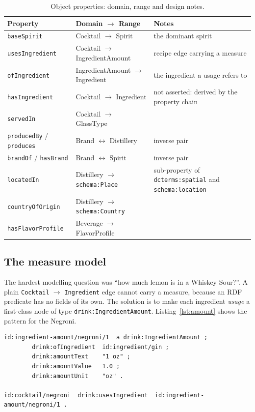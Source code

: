 \begin{table}[h]
  \centering
  \small
  \begin{tabular}{@{}llp{5.6cm}@{}}
    \toprule
    Property & Domain $\rightarrow$ Range & Notes \\
    \midrule
    \texttt{baseSpirit} & Cocktail $\rightarrow$ Spirit & the dominant spirit \\
    \texttt{usesIngredient} & Cocktail $\rightarrow$ IngredientAmount & recipe edge carrying a measure \\
    \texttt{ofIngredient} & IngredientAmount $\rightarrow$ Ingredient & the ingredient a usage refers to \\
    \texttt{hasIngredient} & Cocktail $\rightarrow$ Ingredient & not asserted: derived by the property chain \\
    \texttt{servedIn} & Cocktail $\rightarrow$ GlassType & \\
    \texttt{producedBy} / \texttt{produces} & Brand $\leftrightarrow$ Distillery & inverse pair \\
    \texttt{brandOf} / \texttt{hasBrand} & Brand $\leftrightarrow$ Spirit & inverse pair \\
    \texttt{locatedIn} & Distillery $\rightarrow$ \texttt{schema:Place} & sub-property of \texttt{dcterms:spatial} and \texttt{schema:location} \\
    \texttt{countryOfOrigin} & Distillery $\rightarrow$ \texttt{schema:Country} & \\
    \texttt{hasFlavorProfile} & Beverage $\rightarrow$ FlavorProfile & \\
    \bottomrule
  \end{tabular}
  \caption{Object properties: domain, range and design notes.}
  \label{tab:objectprops}
\end{table}

\subsection{The measure model}

The hardest modelling question was ``how much lemon is in a Whiskey Sour?''. A
plain \texttt{Cocktail} $\rightarrow$ \texttt{Ingredient} edge cannot carry a
measure, because an RDF predicate has no fields of its own. The solution is to
make each ingredient \emph{usage} a first-class node of type
\texttt{drink:IngredientAmount}. Listing~\ref{lst:amount} shows the pattern for
the Negroni.

\begin{lstlisting}[frame=single, basicstyle=\ttfamily\small,
    caption={Ingredient-amount pattern for the Negroni.},
    label={lst:amount}]
id:ingredient-amount/negroni/1  a drink:IngredientAmount ;
        drink:ofIngredient  id:ingredient/gin ;
        drink:amountText    "1 oz" ;
        drink:amountValue   1.0 ;
        drink:amountUnit    "oz" .

id:cocktail/negroni  drink:usesIngredient  id:ingredient-amount/negroni/1 .
\end{lstlisting}

